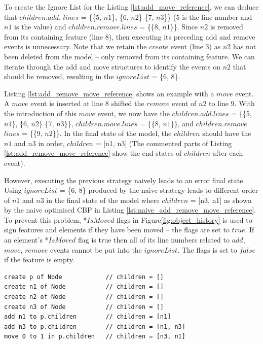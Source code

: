 \documentclass{llncs}
\begin{document}
{    To create the Ignore List for the Listing \ref{lst:add_move_reference}, we can deduce that $children$.$add$. $lines$ = \{\{5, $n1$\}, \{6, $n2$\} \{7, $n3$\}\} (5 is the line number and $n1$ is the value) and $children$.$remove$.$lines$ = \{\{8, $n1$\}\}. Since $n2$ is removed from its containing feature (line 8), then executing its preceding add and remove events is unnecessary. Note that we retain the $create$ event (line 3) as $n2$ has not been deleted from the model -- only removed from its containing feature. We can iterate through the add and move structures to identify the events on $n2$ that should be removed, resulting in the $ignoreList$ = \{6, 8\}.
    
    Listing \ref{lst:add_remove_move_reference} shows an example with a $move$ event. A $move$ event is inserted at line 8 shifted the $remove$ event of $n2$ to line 9. With the introduction of this $move$ event, we now have the $children$.$add$.$lines$ = \{\{5, $n1$\}, \{6, $n2$\} \{7, $n3$\}\}, $children$.$move$.$lines$ = \{\{8, $n1$\}\}, and $children$.$remove$.$lines$ = \{\{9, $n2$\}\}. In the final state of the model, the $children$ should have the $n1$ and $n3$ in order, $children$ = [n1, n3] (The commented parts of Listing \ref{lst:add_remove_move_reference} show the end states of $children$ after each event).  
    
    However, executing the previous strategy naively leads to an error final state. Using $ignoreList$ = \{6, 8\} produced by the naive strategy leads to different order of $n1$ and $n3$ in the final state of the model where $children$ = [n3, n1] as shown by the naive optimised CBP in Listing \ref{lst:naive_add_remove_move_reference}. To prevent this problem, *$IsMoved$ flags in Figure\ref{fig:object_history} is used to sign  features and elements if they have been moved -- the flags are set to $true$. If an element's *$IsMoved$ flag is true then all of its line numbers related to $add$, $move$, $remove$ events cannot be put into the $ignoreList$. The flags is set to $false$ if the feature is empty. 

\begin{lstlisting}[style=eol,caption={A naive optimised CBP representation of original CBP representation in Listing \ref{lst:add_remove_move_reference} .},label=lst:naive_add_remove_move_reference]
create p of Node            // children = []
create n1 of Node           // children = []
create n2 of Node           // children = []
create n3 of Node           // children = []
add n1 to p.children        // children = [n1]
add n3 to p.children        // children = [n1, n3]
move 0 to 1 in p.children   // children = [n3, n1]
\end{lstlisting}

}
\end{document}
